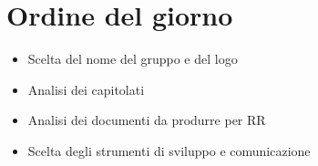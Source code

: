 \section{Ordine del giorno}
\begin{itemize}
    \item Scelta del nome del gruppo e del logo
    \item Analisi dei capitolati
    \item Analisi dei documenti da produrre per RR
    \item Scelta degli strumenti di sviluppo e comunicazione
\end{itemize}